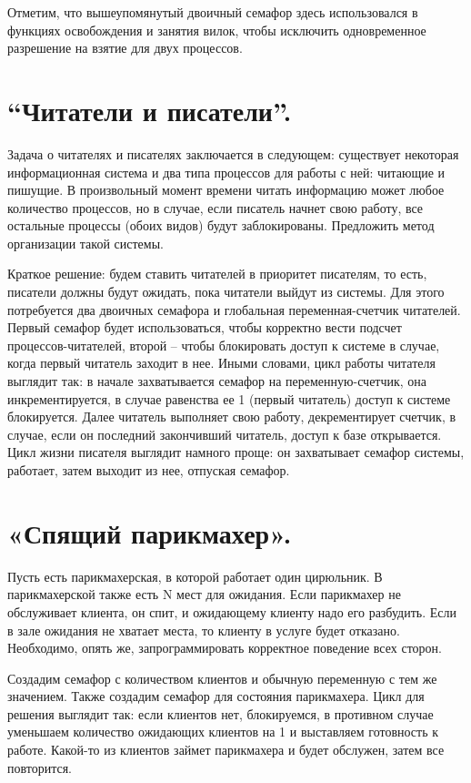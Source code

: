 \documentclass[a4paper,12pt,titlepage,finall]{article}
\begin{document}
Отметим, что вышеупомянутый двоичный семафор здесь использовался в функциях освобождения и занятия вилок, чтобы исключить одновременное разрешение на взятие для двух процессов.

\section{“Читатели и писатели”.}
Задача о читателях и писателях заключается в следующем: существует некоторая информационная система и два типа процессов для работы с ней: читающие и пишущие. В произвольный момент времени читать информацию может любое количество процессов, но в случае, если писатель начнет свою работу, все остальные процессы (обоих видов) будут заблокированы. Предложить метод организации такой системы.

Краткое решение: будем ставить читателей в приоритет писателям, то есть, писатели должны будут ожидать, пока читатели выйдут из системы. Для этого потребуется два двоичных семафора и глобальная переменная-счетчик читателей. Первый семафор будет использоваться, чтобы корректно вести подсчет процессов-читателей, второй -- чтобы блокировать доступ к системе в случае, когда первый читатель заходит в нее. Иными словами, цикл работы читателя выглядит так: в начале захватывается семафор на переменную-счетчик, она инкрементируется, в случае равенства ее 1 (первый читатель) доступ к системе блокируется. Далее читатель выполняет свою работу, декрементирует счетчик, в случае, если он последний закончивший читатель, доступ к базе открывается. Цикл жизни писателя выглядит намного проще: он захватывает семафор системы, работает, затем выходит из нее, отпуская семафор.

\section{«Спящий парикмахер».}
Пусть есть парикмахерская, в которой работает один цирюльник. В парикмахерской также есть N мест для ожидания. Если парикмахер не обслуживает клиента, он спит, и ожидающему клиенту надо его разбудить. Если в зале ожидания не хватает места, то клиенту в услуге будет отказано. Необходимо, опять же, запрограммировать корректное поведение всех сторон.

Создадим семафор с количеством клиентов и обычную переменную с тем же значением. Также создадим семафор для состояния парикмахера. Цикл для решения выглядит так: если клиентов нет, блокируемся, в противном случае уменьшаем количество ожидающих клиентов на 1 и выставляем готовность к работе. Какой-то из клиентов займет парикмахера и будет обслужен, затем все повторится.
\end{document}
